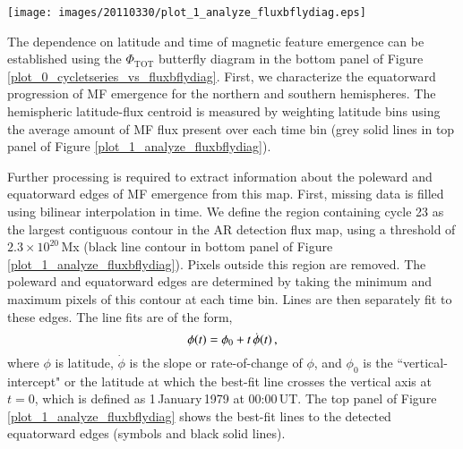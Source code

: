 \documentclass[namedreferences]{solarphysics}
\begin{document}
\begin{article}
\begin{figure*}[!t]
\texttt{[image: images/20110330/plot\_1\_analyze\_fluxbflydiag.eps]}
\caption{\emph{Top}: Flux-weighted latitude centroid for the north and south hemispheres (gray lines), high and low latitude edges (crosses) of detection masks, edges of $10^{22}$\,Mx mask (diamonds), and linear fits to centroids and edges (black lines). \emph{Bottom}: Masks of detected centroids for features of greater than $2.3\times10^{20}$\,Mx, $10^{22}$\,Mx, $5\times10^{22}$\,Mx, and $10^{23}$\,Mx denoted in color from white gray to black, respectively.}\label{plot_1_analyze_fluxbflydiag}
\end{figure*}

The dependence on latitude and time of magnetic feature emergence can be established using the $\Phi_{\mathrm{TOT}}$ butterfly diagram in the bottom panel of Figure \ref{plot_0_cycletseries_vs_fluxbflydiag}. First, we characterize the equatorward progression of MF emergence for the northern and southern hemispheres. The hemispheric latitude-flux centroid is measured by weighting latitude bins using the average amount of MF flux present over each time bin (grey solid lines in top panel of Figure \ref{plot_1_analyze_fluxbflydiag}). 

Further processing is required to extract information about the poleward and equatorward edges of MF emergence from this map. First, missing data is filled using bilinear interpolation in time. We define the region containing cycle 23 as the largest contiguous contour in the AR detection flux map, using a threshold of $2.3\times10^{20}$\,Mx (black line contour in bottom panel of Figure\,\ref{plot_1_analyze_fluxbflydiag}). Pixels outside this region are removed. The poleward and equatorward edges are determined by taking the minimum and maximum pixels of this contour at each time bin. Lines are then separately fit to these edges. 
The line fits are of the form,
\begin{equation}
\phi(t)=\phi_{0}+t\,\dot{\phi}(t) \mbox{\,,}
\end{equation}
where $\phi$ is latitude, $\dot{\phi}$ is the slope or rate-of-change of $\phi$, and $\phi_{0}$ is the ``vertical-intercept" or the latitude at which the best-fit line crosses the vertical axis at $t=0$, which is defined as 1\,January\,1979 at 00:00\,UT. %
 The top panel of Figure\,\ref{plot_1_analyze_fluxbflydiag} shows the best-fit lines to the detected equatorward edges (symbols and black solid lines).


\end{article}
\end{document}
